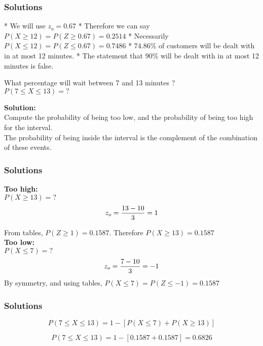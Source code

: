 \begin{frame}
\frametitle{Solutions}
\begin{itemize}
*  We will use $z_o =0.67$
*  Therefore we can say $P(X \geq 12 ) = P(Z \geq 0.67)  = 0.2514$
*  Necessarily  $P(X \leq 12 ) = P(Z \leq 0.67) = 0.7486$
*  $74.86\%$ of customers will be dealt with in at most 12 minutes.
*  The statement that $90\%$ will be dealt with in at most 12 minutes is false.
\end{itemize}
\end{frame}
\begin{frame}
What percentage will wait between 7 and 13 minutes ?\\

$P(7 \leq X \leq 13)   = ?$

\textbf{Solution:}\\
Compute the probability of being too low, and the probability of being too high for the interval.\\The probability of being inside the interval is the complement of the combination of these events.
\end{frame}
\begin{frame}
\frametitle{Solutions}
\textbf{Too high:}\\
$P(X \geq 13) = ?$
\[ z_o  = {13 - 10  \over 3} = 1\]

From tables, $P(Z \geq 1) = 0.1587$. Therefore $P(X \geq 13) = 0.1587$\\ \bigskip
\textbf{Too low:}\\
$P(X \leq 7) = ?$
\[ z_o  = {7 - 10  \over 3} = -1\]
By symmetry, and using tables, $P(X \leq 7) = P(Z \leq -1)= 0.1587$\\ \bigskip
\end{frame}
\begin{frame}
\frametitle{Solutions}

\[P(7 \leq X \leq 13)  = 1 - [ P(X \leq 7)  + P(X \geq 13) ] \]

\[P(7 \leq X \leq 13)  =  1 - [0.1587+0.1587] = 0.6826\]

\end{frame}
                             